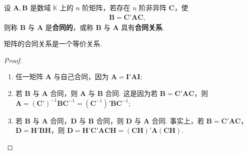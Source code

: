 \documentclass[../../main.tex]{subfiles}%
\begin{document}
\begin{definition}[矩阵的合同关系]\label{definition:矩阵的合同关系}
设 $\boldsymbol{A},\boldsymbol{B}$ 是数域 $\mathbb{K}$ 上的 $n$ 阶矩阵，若存在 $n$ 阶非异阵 $\boldsymbol{C}$，使
\begin{align*}
\boldsymbol{B}=\boldsymbol{C}'\boldsymbol{A}\boldsymbol{C},
\end{align*}
则称 $\boldsymbol{B}$ 与 $\boldsymbol{A}$ 是\textbf{合同的}，或称 $\boldsymbol{B}$ 与 $\boldsymbol{A}$ 具有\textbf{合同关系}.
\end{definition}

\begin{theorem}
矩阵的合同关系是一个等价关系.
\end{theorem}
\begin{proof}
\begin{enumerate}
\item 任一矩阵 $\boldsymbol{A}$ 与自己合同，因为 $\boldsymbol{A}=\boldsymbol{I}'\boldsymbol{A}\boldsymbol{I}$;
\item 若 $\boldsymbol{B}$ 与 $\boldsymbol{A}$ 合同，则 $\boldsymbol{A}$ 与 $\boldsymbol{B}$ 合同. 这是因为若 $\boldsymbol{B}=\boldsymbol{C}'\boldsymbol{A}\boldsymbol{C}$，则 $\boldsymbol{A}=(\boldsymbol{C}')^{-1}\boldsymbol{B}\boldsymbol{C}^{-1}=(\boldsymbol{C}^{-1})'\boldsymbol{B}\boldsymbol{C}^{-1}$;
\item 若 $\boldsymbol{B}$ 与 $\boldsymbol{A}$ 合同，$\boldsymbol{D}$ 与 $\boldsymbol{B}$ 合同，则 $\boldsymbol{D}$ 与 $\boldsymbol{A}$ 合同. 事实上，若 $\boldsymbol{B}=\boldsymbol{C}'\boldsymbol{A}\boldsymbol{C}$，$\boldsymbol{D}=\boldsymbol{H}'\boldsymbol{B}\boldsymbol{H}$，则 $\boldsymbol{D}=\boldsymbol{H}'\boldsymbol{C}'\boldsymbol{A}\boldsymbol{C}\boldsymbol{H}=(\boldsymbol{C}\boldsymbol{H})'\boldsymbol{A}(\boldsymbol{C}\boldsymbol{H})$.
\end{enumerate} 

\end{proof}
\end{document}
